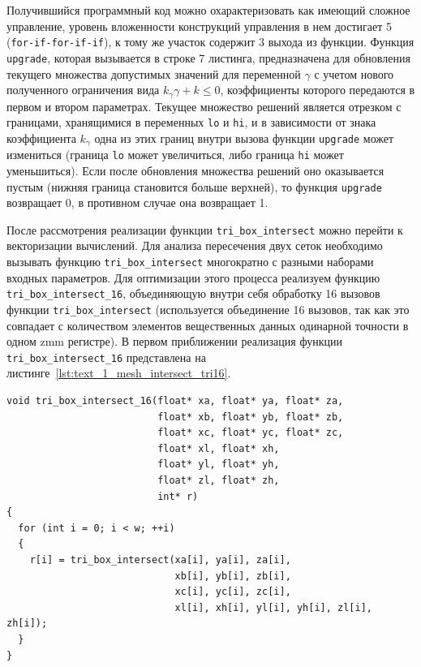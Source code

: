 Получившийся программный код можно охарактеризовать как имеющий сложное управление, уровень вложенности конструкций управления в нем достигает 5 (\texttt{for-if-for-if-if}), к тому же участок содержит 3 выхода из функции.
Функция \texttt{upgrade}, которая вызывается в строке 7 листинга, предназначена для обновления текущего множества допустимых значений для переменной $\gamma$ с учетом нового полученного ограничения вида $k_{\gamma} \gamma + k \le 0$, коэффициенты которого передаются в первом и втором параметрах.
Текущее множество решений является отрезком с границами, хранящимися в переменных \texttt{lo} и \texttt{hi}, и в зависимости от знака коэффициента $k_{\gamma}$ одна из этих границ внутри вызова функции \texttt{upgrade} может измениться (граница \texttt{lo} может увеличиться, либо граница \texttt{hi} может уменьшиться).
Если после обновления множества решений оно оказывается пустым (нижняя граница становится больше верхней), то функция \texttt{upgrade} возвращает 0, в противном случае она возвращает 1.

После рассмотрения реализации функции \texttt{tri\_box\_intersect} можно перейти к векторизации вычислений\label{term:vectorization3}.
Для анализа пересечения двух сеток необходимо вызывать функцию \texttt{tri\_box\_intersect} многократно с разными наборами входных параметров.
Для оптимизации этого процесса реализуем функцию \texttt{tri\_box\_intersect\_16}, объединяющую внутри себя обработку 16 вызовов функции \texttt{tri\_box\_intersect} (используется объединение 16 вызовов, так как это совпадает с количеством элементов вещественных данных одинарной точности в одном zmm регистре).
В первом приближении реализация функции \texttt{tri\_box\_intersect\_16} представлена на листинге~\ref{lst:text_1_mesh_intersect_tri16}.

\begin{singlespace}
\begin{lstlisting}[caption={Исходная реализация функции, объединяющей 16 вызовов функции \texttt{tri\_box\_intersect}.},label={lst:text_1_mesh_intersect_tri16}]
void tri_box_intersect_16(float* xa, float* ya, float* za,
                          float* xb, float* yb, float* zb,
                          float* xc, float* yc, float* zc,
                          float* xl, float* xh,
                          float* yl, float* yh,
                          float* zl, float* zh,
                          int* r)
{
  for (int i = 0; i < w; ++i)
  {
    r[i] = tri_box_intersect(xa[i], ya[i], za[i],
                             xb[i], yb[i], zb[i],
                             xc[i], yc[i], zc[i],
                             xl[i], xh[i], yl[i], yh[i], zl[i], zh[i]);
  }
}
\end{lstlisting}
\end{singlespace}

